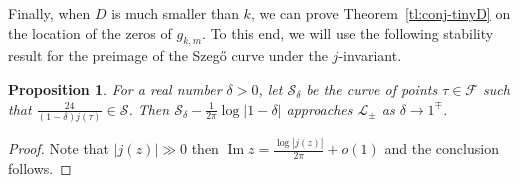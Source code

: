 \documentclass[12pt]{amsart}
\theoremstyle{plain} %
\newtheorem{proposition}[theorem]{Proposition}
\theoremstyle{definition}
\theoremstyle{remark}
\numberwithin{equation}{section}
\renewcommand{\Im}{\operatorname{Im}}
\begin{document}
Finally, when $D$ is much smaller than $k$, we can prove Theorem~\ref{tl:conj-tinyD} on the location of the zeros of $g_{k,m}$. To this end, we will use the following stability result for the preimage of the Szeg\H{o} curve under the $j$-invariant.

\begin{proposition}\label{p:j-szego}
For a real number $\delta>0$, let $\mathcal{S}_\delta$ be the curve of points $\tau\in \mathcal{F}$ such that $\frac{24}{(1-\delta)j(\tau)}\in \mathcal{S}$. Then $\mathcal{S}_\delta-\frac{1}{2\pi}\log|1-\delta|$ approaches $\mathcal{L}_\pm$ as $\delta\to 1^\mp$. 
\end{proposition}
\begin{proof}
Note that $|j(z)|\gg 0$ then $\Im z=\frac{\log |j(z)|}{2\pi}+o(1)$ and the conclusion follows.
\end{proof}
\end{document}
